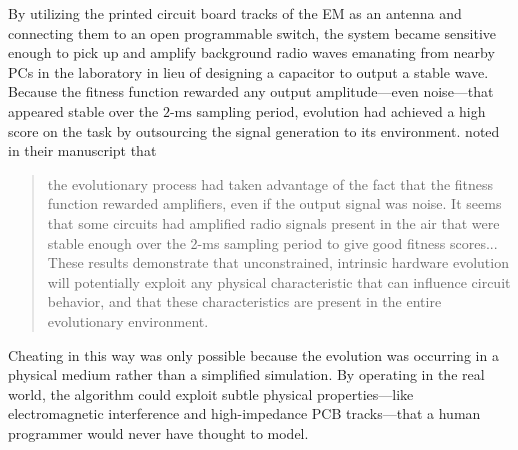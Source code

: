 By utilizing the printed circuit board tracks of the EM as an antenna and connecting them to an open programmable switch, the system became sensitive enough to pick up and amplify background radio waves emanating from nearby PCs in the laboratory in lieu of designing a capacitor to output a stable wave. 
Because the fitness function rewarded any output amplitude---even noise---that appeared stable over the $2\text{-ms}$ sampling period, evolution had achieved a high score on the task by outsourcing the signal generation to its environment. 
\citeauthor{BirdRadio} noted in their manuscript that

\begin{quote}
the evolutionary process had taken advantage of the fact that the fitness function rewarded amplifiers, even if the output signal was noise. 
It seems that some circuits had amplified radio signals present in the air that were stable enough over the 2-ms sampling period to give good fitness scores... 
These results demonstrate that unconstrained, intrinsic hardware evolution will potentially exploit any physical characteristic that can influence circuit behavior, and that these characteristics are present in the entire evolutionary environment.
\end{quote}

Cheating in this way was only possible because the evolution was occurring in a physical medium rather than a simplified simulation. 
By operating in the real world, the algorithm could exploit subtle physical properties---like electromagnetic interference and high-impedance PCB tracks---that a human programmer would never have thought to model.
